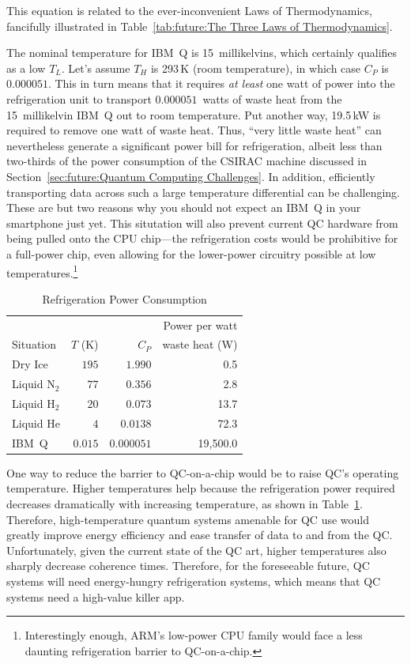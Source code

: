This equation is related to the ever-inconvenient Laws of Thermodynamics,
fancifully illustrated in
Table~\ref{tab:future:The Three Laws of Thermodynamics}.

The nominal temperature for IBM~Q is 15~millikelvins, which certainly
qualifies as a low $T_L$.
Let's assume $T_H$ is 293\,K (room temperature),
in which case $C_P$ is $0.000051$.
This in turn means that it requires \emph{at least} one watt of
power into the refrigeration unit to transport $0.000051$~watts
of waste heat from the 15~millikelvin IBM~Q out to room temperature.
Put another way, 19.5\,kW is required to remove one watt of waste heat.
Thus, ``very little waste heat'' can nevertheless generate a significant
power bill for refrigeration, albeit less than two-thirds of the power
consumption of the CSIRAC machine discussed in
Section~\ref{sec:future:Quantum Computing Challenges}.
In addition, efficiently transporting data across such a large
temperature differential can be challenging.
These are but two reasons why you should not expect an IBM~Q in your
smartphone just yet.
This situtation will also prevent current QC hardware from being pulled
onto the CPU chip---the refrigeration costs would be prohibitive for
a full-power chip, even allowing for the lower-power circuitry possible
at low temperatures.\footnote{
	Interestingly enough, ARM's low-power CPU family would face
	a less daunting refrigeration barrier to QC-on-a-chip.}

\begin{table}
\centering\footnotesize
\begin{tabular}{l|r|r|r}
	&	&	& Power per watt \\
Situation
	& $T$ (K)
		& $C_P$	& waste heat (W) \\
\hline
\hline
Dry Ice
	& $195$
		& $1.990$
			& 0.5 \\
\hline
Liquid N$_2$
	& $77$
		& $0.356$
			& 2.8 \\
\hline
Liquid H$_2$
	& $20$
		& $0.073$
			& 13.7 \\
\hline
Liquid He
	& $4$
		& $0.0138$
			& 72.3 \\
\hline
IBM~Q	& $0.015$
		& $0.000051$
			& 19,500.0 \\
\end{tabular}
\caption{Refrigeration Power Consumption}
\label{tab:future:Refrigeration Power Consumption}
\end{table}

One way to reduce the barrier to QC-on-a-chip would be to raise
QC's operating temperature.
Higher temperatures help because the refrigeration power required
decreases dramatically with increasing temperature, as shown in
Table~\ref{tab:future:Refrigeration Power Consumption}.
Therefore, high-temperature quantum systems amenable for QC use would
greatly improve energy efficiency and ease transfer of data to and from
the QC.
Unfortunately, given the current state of the QC art, higher
temperatures also sharply decrease coherence times.
Therefore, for the foreseeable future, QC systems will need
energy-hungry refrigeration systems, which means that QC
systems need a high-value killer app.


